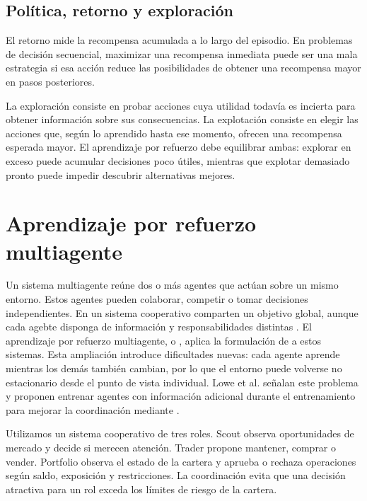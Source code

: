 \subsection{Política, retorno y exploración}

El retorno mide la recompensa acumulada a lo largo del episodio. En problemas de decisión secuencial, maximizar una recompensa inmediata puede ser una mala estrategia si esa acción reduce las posibilidades de obtener una recompensa mayor en pasos posteriores.

La exploración consiste en probar acciones cuya utilidad todavía es incierta para obtener información sobre sus consecuencias. La explotación consiste en elegir las acciones que, según lo aprendido hasta ese momento, ofrecen una recompensa esperada mayor. El aprendizaje por refuerzo debe equilibrar ambas: explorar en exceso puede acumular decisiones poco útiles, mientras que explotar demasiado pronto puede impedir descubrir alternativas mejores.

\section{Aprendizaje por refuerzo multiagente}

Un sistema multiagente reúne dos o más agentes que actúan sobre un mismo entorno. Estos agentes pueden colaborar, competir o tomar decisiones independientes. En un sistema cooperativo comparten un objetivo global, aunque cada agebte disponga de información y responsabilidades distintas \cite{wooldridge2009multiagent,busoniu2008comprehensive}. El aprendizaje por refuerzo multiagente, o , aplica la formulación de  a estos sistemas. Esta ampliación introduce dificultades nuevas: cada agente aprende mientras los demás también cambian, por lo que el entorno puede volverse no estacionario desde el punto de vista individual. Lowe et al. señalan este problema y proponen entrenar agentes con información adicional durante el entrenamiento para mejorar la coordinación mediante  \cite{lowe2017maddpg}.

Utilizamos un sistema cooperativo de tres roles. Scout observa oportunidades de mercado y decide si merecen atención. Trader propone mantener, comprar o vender. Portfolio observa el estado de la cartera y aprueba o rechaza operaciones según saldo, exposición y restricciones. La coordinación evita que una decisión atractiva para un rol exceda los límites de riesgo de la cartera.

